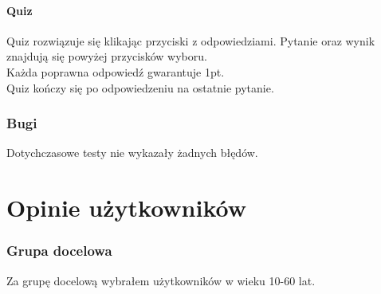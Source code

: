 \documentclass[12pt, a4paper]{article}
\begin{document}
\subsection{Quiz}
Quiz rozwiązuje się klikając przyciski z odpowiedziami. Pytanie oraz wynik znajdują się powyżej przycisków wyboru.\\
Każda poprawna odpowiedź gwarantuje 1pt.\\
Quiz kończy się po odpowiedzeniu na ostatnie pytanie.\\

\section{Bugi}
Dotychczasowe testy nie wykazały żadnych błędów.
\newpage


\part{Opinie użytkowników}
\section{Grupa docelowa}
Za grupę docelową wybrałem użytkowników w wieku 10-60 lat.
\end{document}
